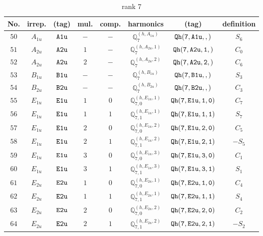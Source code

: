 \documentclass[fleqn,8pt]{jsarticle}
\begin{document}
\begin{table}[ht!]
\begin{center}
\caption{rank 7}
\renewcommand{\arraystretch}{1.3}
\begin{tabular}{cccccccc} \hline \hline
No. & irrep. & (tag) & mul. & comp. & harmonics & (tag) & definition \\ \hline
$ 50 $ & $ A_{1u} $ & $ {\tt A1u} $ & $ - $ & $ - $ & $ \mathbb{Q}_{7}^{(h,A_{1u})} $ & $ {\tt Qh(7,A1u,,)} $ & $ S_{6} $ \\
$ 51 $ & $ A_{2u} $ & $ {\tt A2u} $ & $ 1 $ & $ - $ & $ \mathbb{Q}_{7}^{(h,A_{2u},1)} $ & $ {\tt Qh(7,A2u,1,)} $ & $ C_{0} $ \\
$ 52 $ & $ A_{2u} $ & $ {\tt A2u} $ & $ 2 $ & $ - $ & $ \mathbb{Q}_{7}^{(h,A_{2u},2)} $ & $ {\tt Qh(7,A2u,2,)} $ & $ C_{6} $ \\
$ 53 $ & $ B_{1u} $ & $ {\tt B1u} $ & $ - $ & $ - $ & $ \mathbb{Q}_{7}^{(h,B_{1u})} $ & $ {\tt Qh(7,B1u,,)} $ & $ S_{3} $ \\
$ 54 $ & $ B_{2u} $ & $ {\tt B2u} $ & $ - $ & $ - $ & $ \mathbb{Q}_{7}^{(h,B_{2u})} $ & $ {\tt Qh(7,B2u,,)} $ & $ C_{3} $ \\
$ 55 $ & $ E_{1u} $ & $ {\tt E1u} $ & $ 1 $ & $ 0 $ & $ \mathbb{Q}_{7,0}^{(h,E_{1u},1)} $ & $ {\tt Qh(7,E1u,1,0)} $ & $ C_{7} $ \\
$ 56 $ & $ E_{1u} $ & $ {\tt E1u} $ & $ 1 $ & $ 1 $ & $ \mathbb{Q}_{7,1}^{(h,E_{1u},1)} $ & $ {\tt Qh(7,E1u,1,1)} $ & $ S_{7} $ \\
$ 57 $ & $ E_{1u} $ & $ {\tt E1u} $ & $ 2 $ & $ 0 $ & $ \mathbb{Q}_{7,0}^{(h,E_{1u},2)} $ & $ {\tt Qh(7,E1u,2,0)} $ & $ C_{5} $ \\
$ 58 $ & $ E_{1u} $ & $ {\tt E1u} $ & $ 2 $ & $ 1 $ & $ \mathbb{Q}_{7,1}^{(h,E_{1u},2)} $ & $ {\tt Qh(7,E1u,2,1)} $ & $ - S_{5} $ \\
$ 59 $ & $ E_{1u} $ & $ {\tt E1u} $ & $ 3 $ & $ 0 $ & $ \mathbb{Q}_{7,0}^{(h,E_{1u},3)} $ & $ {\tt Qh(7,E1u,3,0)} $ & $ C_{1} $ \\
$ 60 $ & $ E_{1u} $ & $ {\tt E1u} $ & $ 3 $ & $ 1 $ & $ \mathbb{Q}_{7,1}^{(h,E_{1u},3)} $ & $ {\tt Qh(7,E1u,3,1)} $ & $ S_{1} $ \\
$ 61 $ & $ E_{2u} $ & $ {\tt E2u} $ & $ 1 $ & $ 0 $ & $ \mathbb{Q}_{7,0}^{(h,E_{2u},1)} $ & $ {\tt Qh(7,E2u,1,0)} $ & $ C_{4} $ \\
$ 62 $ & $ E_{2u} $ & $ {\tt E2u} $ & $ 1 $ & $ 1 $ & $ \mathbb{Q}_{7,1}^{(h,E_{2u},1)} $ & $ {\tt Qh(7,E2u,1,1)} $ & $ S_{4} $ \\
$ 63 $ & $ E_{2u} $ & $ {\tt E2u} $ & $ 2 $ & $ 0 $ & $ \mathbb{Q}_{7,0}^{(h,E_{2u},2)} $ & $ {\tt Qh(7,E2u,2,0)} $ & $ C_{2} $ \\
$ 64 $ & $ E_{2u} $ & $ {\tt E2u} $ & $ 2 $ & $ 1 $ & $ \mathbb{Q}_{7,1}^{(h,E_{2u},2)} $ & $ {\tt Qh(7,E2u,2,1)} $ & $ - S_{2} $ \\
 \hline \hline
\end{tabular}
\end{center}
\end{table}
\end{document}
